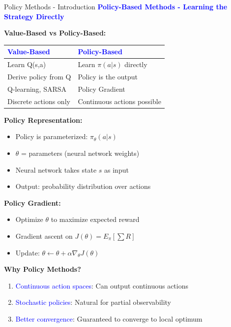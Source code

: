 \documentclass[8pt]{beamer}
\begin{document}
	
	\begin{frame}{Policy Methods - Introduction}
		\fontsize{6.5}{7.5}\selectfont
		\textcolor{blue}{\textbf{Policy-Based Methods - Learning the Strategy Directly}}
		
		\textbf{Value-Based vs Policy-Based:}
		\begin{tabular}{|p{4.5cm}|p{4.5cm}|}
			\hline
			\textcolor{blue}{Value-Based} & \textcolor{blue}{Policy-Based} \\
			\hline
			Learn Q(s,a) & Learn $\pi(a|s)$ directly \\
			\hline
			Derive policy from Q & Policy is the output \\
			\hline
			Q-learning, SARSA & Policy Gradient \\
			\hline
			Discrete actions only & Continuous actions possible \\
			\hline
		\end{tabular}
		
		\textbf{Policy Representation:}
		\begin{itemize}
			\item Policy is parameterized: $\pi_\theta(a|s)$
			\item $\theta$ = parameters (neural network weights)
			\item Neural network takes state $s$ as input
			\item Output: probability distribution over actions
		\end{itemize}
		
		\textbf{Policy Gradient:}
		\begin{itemize}
			\item Optimize $\theta$ to maximize expected reward
			\item Gradient ascent on $J(\theta) = E_\pi[\sum R]$
			\item Update: $\theta \leftarrow \theta + \alpha \nabla_\theta J(\theta)$
		\end{itemize}
		
		\textbf{Why Policy Methods?}
		\begin{enumerate}
			\item \textcolor{blue}{Continuous action spaces}: Can output continuous actions
			\item \textcolor{blue}{Stochastic policies}: Natural for partial observability
			\item \textcolor{blue}{Better convergence}: Guaranteed to converge to local optimum
		\end{enumerate}
		

\end{frame}
\end{document}
